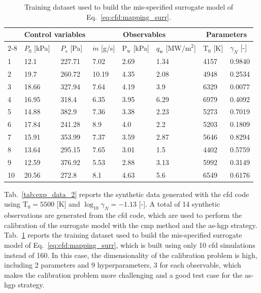 \begin{table}[htbp] 
  \small
  \centering
  \begin{tabular}{|p{0.2cm}|p{1.2cm}|p{1.0cm}|p{1.0cm}|p{1.3cm}|p{1.9cm}| p{1.0cm}| p{1.0cm}|} 
    \hline
    & \multicolumn{2}{|c|}{\textbf{Control variables}} &\multicolumn{3}{|c|}{\textbf{Observables}} &\multicolumn{2}{|c|}{\textbf{Parameters}} \\ \cline{2-8} 
      & $P_0$ [kPa] & $P_s$ [Pa] & $\dot{m}$ [g/s] & $\mathrm{P}_{\mathrm{w}}$ [kPa] & $q_{\mathrm{w}}$ [MW/m$^2$] & $\mathrm{T}_0$ [K] & $\gamma_N$ [-] \\ \hline
    1 & 12.1 & 227.71 & 7.02 & 2.69 & 1.34 & 4157 & 0.9840 \\ 
    2 & 19.7 & 260.72 & 10.19 & 4.35 & 2.08 & 4948 & 0.2534 \\ 
    3 & 18.66 & 327.94 & 7.64 & 4.19 & 3.9  & 6329 & 0.0077\\ 
    4 & 16.95 & 318.4 & 6.35 & 3.95 & 6.29  & 6979 & 0.4092\\ 
    5 & 14.88 & 382.9 & 7.36 & 3.38 & 2.23  & 5273 & 0.7019\\ 
    6 & 17.84 & 241.28 & 8.9 & 4.0 & 2.2  & 5203 & 0.1809\\ 
    7 & 15.91 & 353.99 & 7.37 & 3.59 & 2.87  & 5646 & 0.8294\\ 
    8 & 13.64 & 295.15 & 7.65 & 3.01 & 1.5  & 4402 & 0.5759\\ 
    9 & 12.59 & 376.92 & 5.53 & 2.88 & 3.13  & 5992 & 0.3149\\ 
    10 & 20.56 & 272.8 & 8.1 & 4.63 & 5.6  & 6549 & 0.6176\\ 
    \hline
  \end{tabular}
  \caption{Training dataset used to build the mis-specified surrogate model of Eq.~\eqref{eq:cfd:mapping_surr}.}
  \label{tab:training_data}
\end{table}

Tab.~\ref{tab:exp_data_2} reports the synthetic data generated with the \gls{cfd} code using $\mathrm{T}_0=5500$ [K] and $\log_{10} \gamma_N = -1.13$ [-]. A total of 14 synthetic observations are generated from the \gls{cfd} code, which are used to perform the calibration of the surrogate model with the \gls{cmp} method and the \gls{as}-\gls{hgp} strategy. Tab.~\ref{tab:training_data} reports the training dataset used to build the mis-specified surrogate model of Eq.~\eqref{eq:cfd:mapping_surr}, which is built using only 10 \gls{cfd} simulations instead of 160. In this case, the dimensionality of the calibration problem is high, including 2 parameters and 9 hyperparameters, 3 for each observable, which makes the calibration problem more challenging and a good test case for the \gls{as}-\gls{hgp} strategy.

